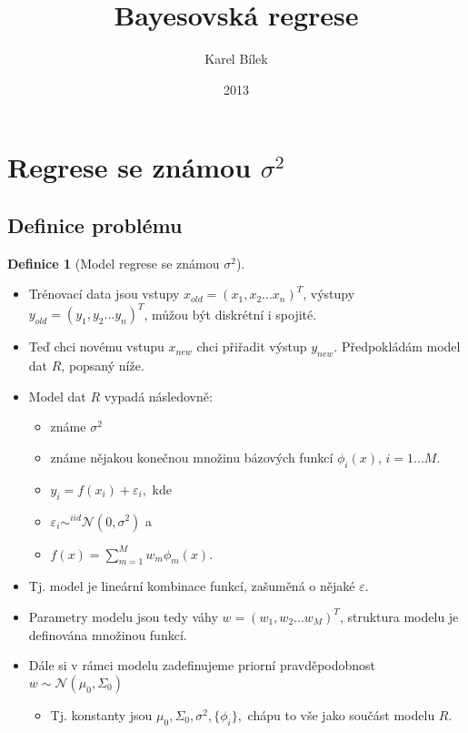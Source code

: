 \documentclass{article}
\title{Bayesovská regrese}
\author{Karel Bílek}
\date{2013}
\newenvironment{pitemize}{
\begin{itemize}
  \setlength{\itemsep}{5pt}
  \setlength{\parskip}{0pt}
  \setlength{\parsep}{0pt}
}{\end{itemize}}
\newcommand{\NN}{\mathcal{N}}
\theoremstyle{definition}
\newtheorem{definice}{Definice}
\begin{document}
\maketitle

\section{Regrese se známou $\sigma^2$}
\subsection{Definice problému}
\begin{definice}[Model regrese se známou $\sigma^2$]
\label{defmodel}
\end {definice}
\begin{pitemize}
\item Trénovací data jsou vstupy $x_{old}=(x_1,x_2...x_n)^T$, výstupy $y_{old}=(y_1,y_2...y_n)^T$, můžou být diskrétní i spojité.

\item Teď chci novému vstupu $x_{new}$ chci přiřadit výstup $y_{new}$. Předpokládám model dat $R$, popsaný níže.

\item Model dat $R$ vypadá následovně:
\begin{pitemize}

\item známe $\sigma^2$
\item známe nějakou konečnou množinu bázových funkcí $\phi_i(x)$, $i=1...M$.

\item $y_i=f(x_i)+\varepsilon_i,$ kde 
\item $\varepsilon_i \sim ^ {iid} \NN\left(0,\sigma^2\right)$ a 
\item $f(x)= \sum_{m=1}^Mw_m\phi_m(x).$
\end{pitemize}
\item  Tj. model je lineární kombinace funkcí, zašuměná o nějaké $\varepsilon$.
\item Parametry modelu jsou tedy váhy $w=(w_1,w_2...w_M)^T$, struktura modelu je definována mno\-ži\-nou funkcí.

\item Dále si v rámci modelu zadefinujeme priorní pravděpodobnost $w\sim \NN(\mu_0,\Sigma_0)$
\begin{itemize}
\item Tj. konstanty jsou $\mu_0, \Sigma_0, \sigma^2,\{\phi_i\},$ chápu to vše jako součást modelu $R$.
\end{itemize}
\end{pitemize}
\end{document}
